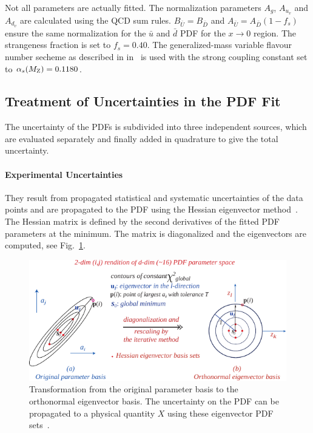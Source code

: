 Not all parameters are actually fitted. The normalization parameters $A_g$,
$A_{u_{v}}$ and $A_{d_{v}}$ are calculated using the QCD sum rules. $B_{\bar
U}=B_{\bar D}$ and $A_{\bar U} = A_{\bar D}(1-f_s)$ ensure the same
normalization for the $\bar u$ and $\bar d$ PDF for the $x \rightarrow 0$
region. The strangeness fraction is set to $f_s = 0.40$. The generalized-mass
variable flavour number secheme as described in
in~\cite{Thorne:1997ga,Thorne:2006qt} is used with the strong coupling constant
set to $\alpha_{s}(M_\mathrm{Z})= 0.1180$.


\subsection{Treatment of Uncertainties in the PDF Fit}
\label{section:treatment_pdf_uncertainties}

The uncertainty of the PDFs is subdivided into three independent sources, which
are evaluated separately and finally added in quadrature to give the total
uncertainty.

\paragraph{Experimental Uncertainties} 
They result from propagated statistical and systematic uncertainties of the data
points and are propagated to the PDF using the Hessian eigenvector
method~\cite{Pumplin:2001ct}. The Hessian matrix is defined by the second
derivatives of the fitted PDF parameters at the \chisq minimum. The matrix is
diagonalized and the eigenvectors are computed, see
Fig.~\ref{fig:eigenvector_basis_set}. 

\begin{figure}[htb]
  \centering
  \includegraphics[width=1.0\textwidth]{figures/pdf_constraints/hessianmethod.pdf}
  \caption[Transformation of the parameter basis to the eigenvector basis.]
    {Transformation from the original parameter basis to the orthonormal
    eigenvector basis. The uncertainty on the PDF can be propagated to a
    physical quantity $X$ using these eigenvector PDF sets~\cite{Pumplin:2001ct}.}
    \label{fig:eigenvector_basis_set}
\end{figure}

